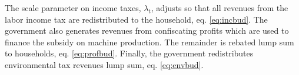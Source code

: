 The scale parameter on income taxes, $\lambda_t$, adjusts so that all revenues from the labor income tax are redistributed to the household, eq. \eqref{eq:incbud}.
The government also generates revenues from confiscating profits which are used to finance the subsidy on machine production. The remainder is rebated lump sum to households, eq. \eqref{eq:profbud}. 
Finally, the government redistributes environmental tax revenues lump sum, eq. \eqref{eq:envbud}.

